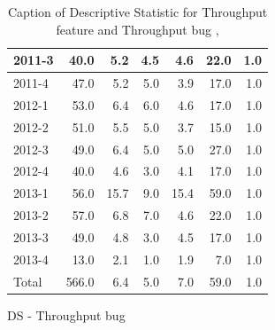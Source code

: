 \documentclass[UKenglish]{ifimaster}  %
\begin{document}
\begin{appendices}
\begin{table}[!htbp]
\begin{adjustwidth}{-2.5cm}{}
\begin{subfigure}[b]{0.3\textwidth}
{\begin{tabular}{ | l | r | r | r | r | r | r | }
2011-3 & 40.0 & 5.2 & 4.5 & 4.6 & 22.0 & 1.0\\ \hline
2011-4 & 47.0 & 5.2 & 5.0 & 3.9 & 17.0 & 1.0\\ \hline
2012-1 & 53.0 & 6.4 & 6.0 & 4.6 & 17.0 & 1.0\\ \hline
2012-2 & 51.0 & 5.5 & 5.0 & 3.7 & 15.0 & 1.0\\ \hline
2012-3 & 49.0 & 6.4 & 5.0 & 5.0 & 27.0 & 1.0\\ \hline
2012-4 & 40.0 & 4.6 & 3.0 & 4.1 & 17.0 & 1.0\\ \hline
2013-1 & 56.0 & 15.7 & 9.0 & 15.4 & 59.0 & 1.0\\ \hline
2013-2 & 57.0 & 6.8 & 7.0 & 4.6 & 22.0 & 1.0\\ \hline
2013-3 & 49.0 & 4.8 & 3.0 & 4.5 & 17.0 & 1.0\\ \hline
2013-4 & 13.0 & 2.1 & 1.0 & 1.9 & 7.0 & 1.0\\ \hline
Total & 566.0 & 6.4 & 5.0 & 7.0 & 59.0 & 1.0\\ \hline
\end{tabular}
}
\caption{DS - Throughput bug}
 \label{DS:TPB:5}
\end{subfigure}
\end{adjustwidth}
\caption[Optional caption for list of figures]{Caption of Descriptive Statistic for Throughput feature and Throughput bug  , }
\label{DS:5:2}
\end{table}



\end{appendices}
\end{document}
